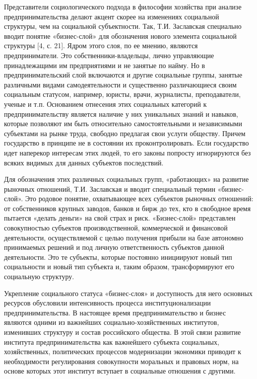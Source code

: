\documentclass[a4paper, 12pt]{article}%
\begin{document}
Представители социологического подхода в философии хозяйства при анализе предпринимательства делают акцент скорее на изменениях социальной структуры, чем на социальной субъектности. Так, Т.И. Заславская специально вводит понятие «бизнес-слой» для обозначения нового элемента социальной структуры [4, с. 21]. Ядром этого слоя, по ее мнению, являются предприниматели. Это собственники-владельцы, лично управляющие принадлежащими им предприятиями и не занятые по найму. Но в предпринимательский слой включаются и другие социальные группы, занятые различными видами самодеятельности и существенно различающиеся своим социальным статусом, например, юристы, врачи, журналисты, преподаватели, ученые и т.п. Основанием отнесения этих социальных категорий к предпринимательству является наличие у них уникальных знаний и навыков, которые позволяют им быть относительно самостоятельными и независимыми субъектами на рынке труда, свободно предлагая свои услуги обществу. Причем государство в принципе не в состоянии их проконтролировать. Если государство идет наперекор интересам этих людей, то его законы попросту игнорируются без всяких видимых для данных субъектов последствий.

Для обозначения этих различных социальных групп, «работающих» на развитие рыночных отношений, Т.И. Заславская и вводит специальный термин «бизнес-слой». Это родовое понятие, охватывающее всех субъектов рыночных отношений: от собственников крупных заводов, банков и бирж до тех, кто в свободное время пытается «делать деньги» на свой страх и риск. «Бизнес-слой» представлен совокупностью субъектов производственной, коммерческой и финансовой деятельности, осуществляемой с целью получения прибыли на базе автономно принимаемых решений и под личную ответственность субъектов данной деятельности. Это те субъекты, которые постоянно инициируют новый тип социальности и новый тип субъекта и, таким образом, трансформируют его социальную структуру.

Укрепление социального статуса «бизнес-слоя» и доступность для него основных ресурсов обусловили интенсивность процесса институционализации предпринимательства. В настоящее время предпринимательство и бизнес являются одними из важнейших социально-хозяйственных институтов, изменивших структуру и состав российского общества. В этой связи развитие института предпринимательства как важнейшего субъекта социальных, хозяйственных, политических процессов модернизации экономики приводит к необходимости регулирования совокупности моральных и правовых норм, на основе которых этот институт вступает в социальные отношения с другими.
\end{document}
